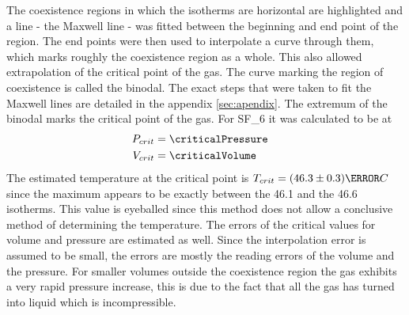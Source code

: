 \documentclass[a4paper,10pt,twocolumn]{article}
\begin{document}
    The coexistence regions in which the isotherms are horizontal are highlighted and a line - the Maxwell line - was fitted between the beginning and end point of the region.
    The end points were then used to interpolate a curve through them, which marks roughly the coexistence region as a whole.
    This also allowed extrapolation of the critical point of the gas.
    The curve marking the region of coexistence is called the binodal.
    The exact steps that were taken to fit the Maxwell lines are detailed in the appendix \ref{sec:apendix}. %
    The extremum of the binodal marks the critical point of the gas. 
    For SF_6\) it was calculated to be at
    \begin{align}
        P_{crit} &= \criticalPressure 
        \endline
        V_{crit} &= \criticalVolume 
        \end{align}
    The estimated temperature at the critical point is $T_{crit} = (46.3 \pm 0.3)\degree C $ since the maximum appears to be exactly between the 46.1\degree\) and the 46.6\degree\) isotherms.
    This value is eyeballed since this method does not allow a conclusive method of determining the temperature.
    The errors of the critical values for volume and pressure are estimated as well.
    Since the interpolation error is assumed to be small, the errors are mostly the reading errors of the volume and the pressure.
    For smaller volumes outside the coexistence region the gas exhibits a very rapid pressure increase, this is due to the fact that all the gas has turned into liquid which is incompressible.
\end{document}
